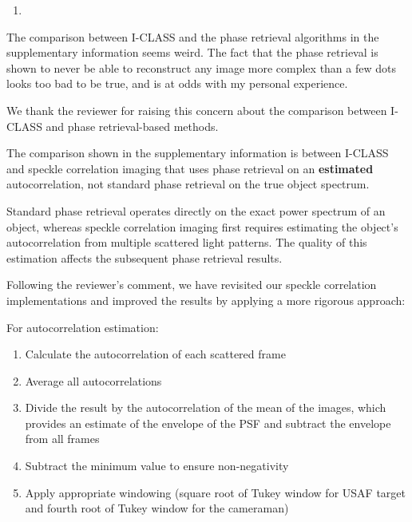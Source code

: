 \documentclass[12pt]{article}
\newenvironment{solved_reviewercomment}
    {\begin{tcolorbox}[width=\linewidth,colback=gray!5,colframe=solved_commentcolor!50,title=Reviewer Comment,left=5pt,right=5pt]}
    {\end{tcolorbox}}
\newenvironment{ourresponse}
    {\begin{tcolorbox}[width=\linewidth,breakable,enhanced,colback=gray!5,colframe=responsecolor!50,title=Response,left=5pt,right=5pt]}
    {\end{tcolorbox}}
\begin{document}
\begin{enumerate}[label=\arabic*., resume]
\item \leavevmode
\end{enumerate}
\vspace{-1em}
\begin{solved_reviewercomment}
    The comparison between I-CLASS and the phase retrieval algorithms in the supplementary information seems weird. The fact that the phase retrieval is shown to never be able to reconstruct any image more complex than a few dots looks too bad to be true, and is at odds with my personal experience.
\end{solved_reviewercomment}

\begin{ourresponse}
    We thank the reviewer for raising this concern about the comparison between I-CLASS and phase retrieval-based methods.
    
    The comparison shown in the supplementary information is between I-CLASS and speckle correlation imaging that uses phase retrieval on an \textbf{estimated} autocorrelation, not standard phase retrieval on the true object spectrum.
    
    Standard phase retrieval operates directly on the exact power spectrum of an object, whereas speckle correlation imaging first requires estimating the object's autocorrelation from multiple scattered light patterns. The quality of this estimation affects the subsequent phase retrieval results.
    
    Following the reviewer's comment, we have revisited our speckle correlation implementations and improved the results by applying a more rigorous approach:
    
    For autocorrelation estimation:
    \begin{enumerate}
        \item Calculate the autocorrelation of each scattered frame
        \item Average all autocorrelations
        \item Divide the result by the autocorrelation of the mean of the images, which provides an estimate of the envelope of the PSF and subtract the envelope from all frames
        \item Subtract the minimum value to ensure non-negativity
        \item Apply appropriate windowing (square root of Tukey window for USAF target and fourth root of Tukey window for the cameraman)
    \end{enumerate}
    

\end{ourresponse}
\end{document}
